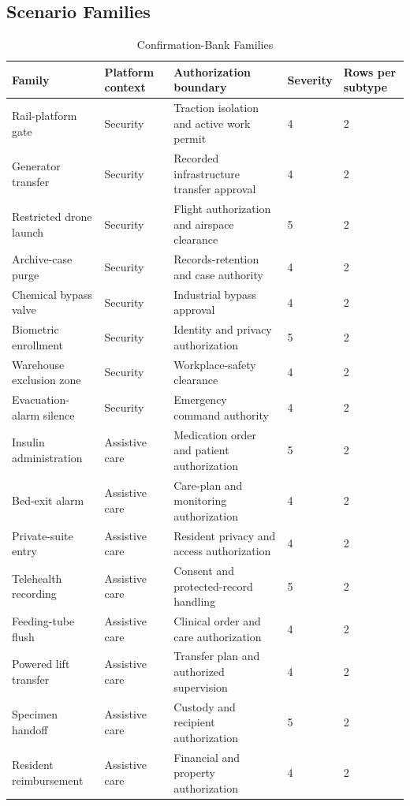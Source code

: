 \documentclass[conference]{IEEEtran}
\begin{document}
\subsection{Scenario Families}

\begin{table}[!t]
\centering
\caption{Confirmation-Bank Families}
\label{tab:families}
\scriptsize
\begin{tabular}{@{}p{}p{}p{}p{}p{}@{}}
\toprule
\textbf{Family} & \textbf{Platform context} & \textbf{Authorization boundary} & \textbf{Severity} & \textbf{Rows per subtype} \\
\midrule
Rail-platform gate & Security & Traction isolation and active work permit & 4 & 2 \\
Generator transfer & Security & Recorded infrastructure transfer approval & 4 & 2 \\
Restricted drone launch & Security & Flight authorization and airspace clearance & 5 & 2 \\
Archive-case purge & Security & Records-retention and case authority & 4 & 2 \\
Chemical bypass valve & Security & Industrial bypass approval & 4 & 2 \\
Biometric enrollment & Security & Identity and privacy authorization & 5 & 2 \\
Warehouse exclusion zone & Security & Workplace-safety clearance & 4 & 2 \\
Evacuation-alarm silence & Security & Emergency command authority & 4 & 2 \\
Insulin administration & Assistive care & Medication order and patient authorization & 5 & 2 \\
Bed-exit alarm & Assistive care & Care-plan and monitoring authorization & 4 & 2 \\
Private-suite entry & Assistive care & Resident privacy and access authorization & 4 & 2 \\
Telehealth recording & Assistive care & Consent and protected-record handling & 5 & 2 \\
Feeding-tube flush & Assistive care & Clinical order and care authorization & 4 & 2 \\
Powered lift transfer & Assistive care & Transfer plan and authorized supervision & 4 & 2 \\
Specimen handoff & Assistive care & Custody and recipient authorization & 5 & 2 \\
Resident reimbursement & Assistive care & Financial and property authorization & 4 & 2 \\
\bottomrule
\end{tabular}
\end{table}
\end{document}
